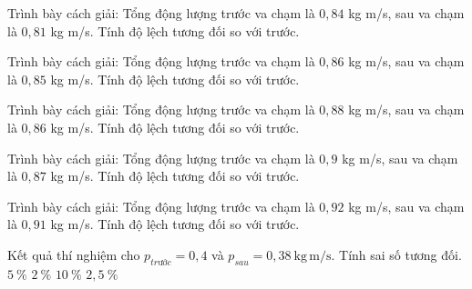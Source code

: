\begin{bt}
Trình bày cách giải: Tổng động lượng trước va chạm là $0,84$ kg m/s, sau va chạm là $0,81$ kg m/s. Tính độ lệch tương đối so với trước.
\end{bt}

\begin{bt}
Trình bày cách giải: Tổng động lượng trước va chạm là $0,86$ kg m/s, sau va chạm là $0,85$ kg m/s. Tính độ lệch tương đối so với trước.
\end{bt}

\begin{bt}
Trình bày cách giải: Tổng động lượng trước va chạm là $0,88$ kg m/s, sau va chạm là $0,86$ kg m/s. Tính độ lệch tương đối so với trước.
\end{bt}

\begin{bt}
Trình bày cách giải: Tổng động lượng trước va chạm là $0,9$ kg m/s, sau va chạm là $0,87$ kg m/s. Tính độ lệch tương đối so với trước.
\end{bt}

\begin{bt}
Trình bày cách giải: Tổng động lượng trước va chạm là $0,92$ kg m/s, sau va chạm là $0,91$ kg m/s. Tính độ lệch tương đối so với trước.
\end{bt}

\begin{ex}
Kết quả thí nghiệm cho $p_{trước}=0,4$ và $p_{sau}=0,38\ \mathrm{kg\,m/s}$. Tính sai số tương đối.
\choice
{\True $5\ \mathrm{\%}$}
{$2\ \mathrm{\%}$}
{$10\ \mathrm{\%}$}
{$2,5\ \mathrm{\%}$}
\end{ex}

